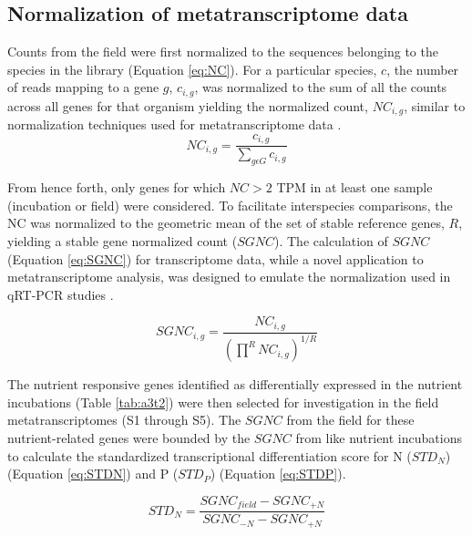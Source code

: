 \subsection{Normalization of metatranscriptome data}
Counts from the field were first normalized to the sequences belonging to the species in the library (Equation \ref{eq:NC}). For a particular species, $c$, the number of reads mapping to a gene $g$, $c_{i,g}$, was normalized to the sum of all the counts across all genes for that organism yielding the normalized count, $NC_{i,g}$, similar to normalization techniques used for metatranscriptome data \citep{Marchetti2012a, Ottesen2011}. 
\begin{equation}
	\label{eq:NC}
	NC_{i,g} = \frac{c_{i,g}}{\sum \limits_{g \epsilon G} c_{i,g}}
\end{equation}

From hence forth, only genes for which $NC > 2$ TPM in at least one sample (incubation or field) were considered. To facilitate interspecies comparisons, the NC was normalized to the geometric mean of the set of stable reference genes, $R$, yielding a stable gene normalized count ($SGNC$). The calculation of $SGNC$ (Equation \ref{eq:SGNC}) for transcriptome data, while a novel application to metatranscriptome analysis, was designed to emulate the normalization used in qRT-PCR studies \citep{Vandesompele2002}. \par
\begin{equation}
	\label{eq:SGNC}
 	SGNC_{i,g}=\frac{NC_{i,g}}{\left ( \prod \limits^{R} NC_{i,g} \right ) ^{1/R}}
\end{equation}

The nutrient responsive genes identified as differentially expressed in the nutrient incubations (Table \ref{tab:a3t2}) were then selected for investigation in the field metatranscriptomes (S1 through S5). The $SGNC$ from the field for these nutrient-related genes were bounded by the $SGNC$ from like nutrient incubations to calculate the standardized transcriptional differentiation score for N ($STD_N$) (Equation \ref{eq:STDN}) and P ($STD_P$) (Equation \ref{eq:STDP}).\par 

\begin{equation}
	\label{eq:STDN}
	STD_N = \frac{SGNC_{field} - SGNC_{+N}}{SGNC_{-N} - SGNC_{+N}} 	
\end{equation}

